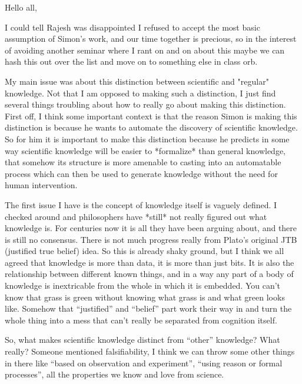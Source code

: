 Hello all,

I could tell Rajesh was disappointed I refused to accept the most basic assumption of Simon's work, and our time together is precious, so in the interest of avoiding another seminar where I rant on and on about this maybe we can hash this out over the list and move on to something else in class orb.































My main issue was about this distinction between scientific and "regular" knowledge.  Not that I am opposed to making such a distinction, I just find several things troubling about how to really go about making this distinction.  First off, I think some important context is that the reason Simon is making this distinction is because he wants to automate the discovery of scientific knowledge.  So for him it is important to make this distinction because he predicts in some way scientific knowledge will be easier to *formalize* than general knowledge, that somehow its structure is more amenable to casting into an automatable process which can then be used to generate knowledge without the need for human intervention.

The first issue I have is the concept of knowledge itself is vaguely defined.  I checked around and philosophers have *still* not really figured out what knowledge is.  For centuries now it is all they have been arguing about, and there is still no consensus.  There is not much progress really from Plato's original JTB (justified true belief) idea.  So this is already shaky ground, but I think we all agreed that knowledge is more than data, it is more than just bits.  It is also the relationship between different known things, and in a way any part of a body of knowledge is inextricable from the whole in which it is embedded.  You can't know that grass is green without knowing what grass is and what green looks like.  Somehow that ``justified'' and ``belief'' part work their way in and turn the whole thing into a mess that can't really be separated from cognition itself.  

So, what makes scientific knowledge distinct from ``other'' knowledge?  What really?  Someone mentioned falsifiability, I think we can throw some other things in there like ``based on observation and experiment'', ``using reason or formal processes'', all the properties we know and love from science.    
